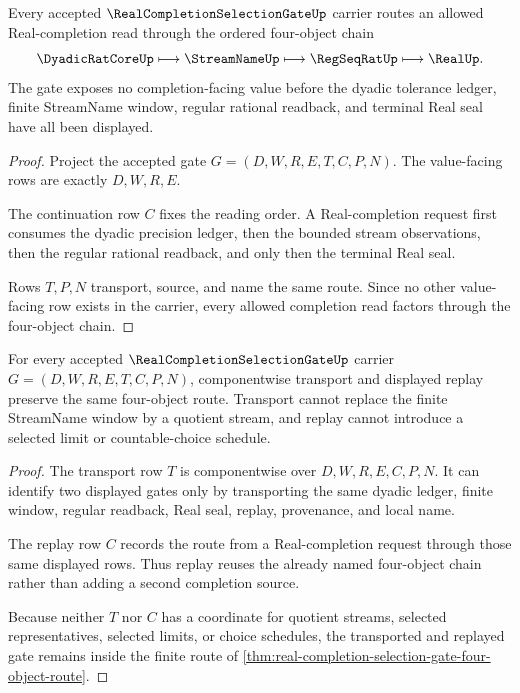 \begin{theorem}
\label{thm:real-completion-selection-gate-four-object-route}
Every accepted $\RealCompletionSelectionGateUp$ carrier routes an allowed Real-completion read through the ordered four-object chain
$$
\DyadicRatCoreUp \longmapsto \StreamNameUp \longmapsto \RegSeqRatUp \longmapsto \RealUp .
$$
The gate exposes no completion-facing value before the dyadic tolerance ledger, finite StreamName window, regular rational readback, and terminal Real seal have all been displayed.
\end{theorem}
\begin{proof}
Project the accepted gate $G=(D,W,R,E,T,C,P,N)$. The value-facing rows are exactly $D,W,R,E$.

The continuation row $C$ fixes the reading order. A Real-completion request first consumes the dyadic precision ledger, then the bounded stream observations, then the regular rational readback, and only then the terminal Real seal.

Rows $T,P,N$ transport, source, and name the same route. Since no other value-facing row exists in the carrier, every allowed completion read factors through the four-object chain.
\end{proof}

\begin{theorem}
\label{thm:real-completion-selection-gate-transport-replay}
For every accepted $\RealCompletionSelectionGateUp$ carrier $G=(D,W,R,E,T,C,P,N)$, componentwise transport and displayed replay preserve the same four-object route. Transport cannot replace the finite StreamName window by a quotient stream, and replay cannot introduce a selected limit or countable-choice schedule.
\end{theorem}
\begin{proof}
The transport row $T$ is componentwise over $D,W,R,E,C,P,N$. It can identify two displayed gates only by transporting the same dyadic ledger, finite window, regular readback, Real seal, replay, provenance, and local name.

The replay row $C$ records the route from a Real-completion request through those same displayed rows. Thus replay reuses the already named four-object chain rather than adding a second completion source.

Because neither $T$ nor $C$ has a coordinate for quotient streams, selected representatives, selected limits, or choice schedules, the transported and replayed gate remains inside the finite route of \autoref{thm:real-completion-selection-gate-four-object-route}.
\end{proof}

